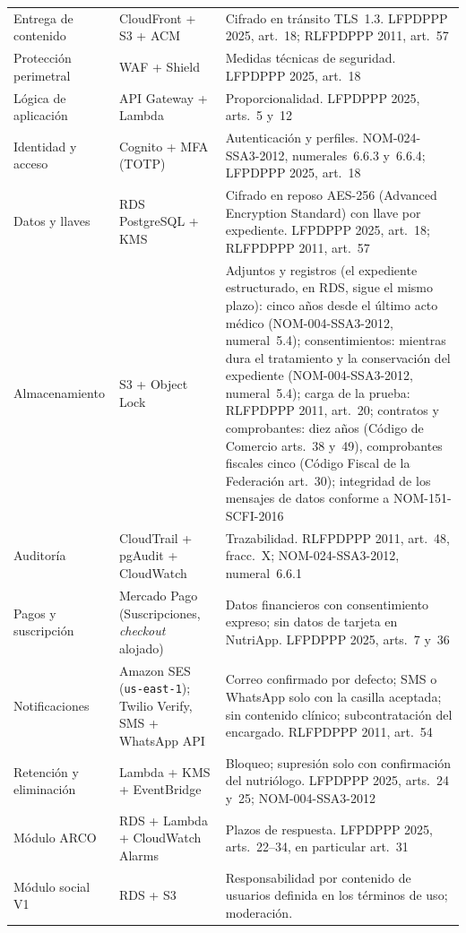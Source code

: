 \documentclass[12pt, a4paper]{article}
\begin{document}
\begin{longtable}{>{\raggedright\arraybackslash}p{3cm}
  >{\raggedright\arraybackslash}p{4cm}
  >{\raggedright\arraybackslash}p{7.2cm}}
  Entrega de contenido & CloudFront + S3 + ACM & Cifrado en tránsito
    TLS~1.3. LFPDPPP 2025, art.~18; RLFPDPPP 2011, art.~57 \\[4pt]
  Protección perimetral & WAF + Shield & Medidas técnicas de
    seguridad. LFPDPPP 2025, art.~18 \\[4pt]
  Lógica de aplicación & API Gateway + Lambda & Proporcionalidad.
    LFPDPPP 2025, arts.~5 y~12 \\[4pt]
  Identidad y acceso & Cognito + MFA (TOTP) & Autenticación y perfiles.
    NOM-024-SSA3-2012, numerales~6.6.3 y~6.6.4; LFPDPPP 2025, art.~18 \\[4pt]
  Datos y llaves & RDS PostgreSQL + KMS & Cifrado en reposo AES-256 (Advanced Encryption Standard) con
    llave por expediente. LFPDPPP 2025, art.~18; RLFPDPPP 2011, art.~57 \\[4pt]
  Almacenamiento & S3 + Object Lock & Adjuntos y registros (el
    expediente estructurado, en RDS, sigue el mismo plazo): cinco años
    desde el último acto médico (NOM-004-SSA3-2012, numeral~5.4);
    consentimientos: mientras dura el tratamiento y la conservación del
    expediente (NOM-004-SSA3-2012, numeral~5.4); carga de la prueba: RLFPDPPP 2011, art.~20;    contratos y comprobantes: diez años (Código de Comercio arts.~38
    y~49), comprobantes fiscales cinco (Código Fiscal de la Federación
    art.~30); integridad de los mensajes de datos
    conforme a NOM-151-SCFI-2016 \\[4pt]
  Auditoría & CloudTrail + pgAudit + CloudWatch & Trazabilidad.
    RLFPDPPP 2011, art.~48, fracc.~X; NOM-024-SSA3-2012, numeral~6.6.1 \\[4pt]
  Pagos y suscripción & Mercado Pago (Suscripciones, \textit{checkout} alojado) & Datos
    financieros con consentimiento expreso; sin datos de tarjeta en
    NutriApp. LFPDPPP 2025, arts.~7 y~36 \\[4pt]
  Notificaciones & Amazon SES (\texttt{us-east-1}); Twilio Verify, SMS + WhatsApp API & Correo
    confirmado por defecto; SMS o WhatsApp solo con la casilla aceptada;
    sin contenido clínico; subcontratación del encargado. RLFPDPPP 2011,
    art.~54 \\[4pt]
  Retención y eliminación & Lambda + KMS + EventBridge & Bloqueo;
    supresión solo con confirmación del nutriólogo. LFPDPPP 2025,
    arts.~24 y~25; NOM-004-SSA3-2012 \\[4pt]
  Módulo ARCO & RDS + Lambda + CloudWatch Alarms & Plazos de respuesta.
    LFPDPPP 2025, arts.~22--34, en particular art.~31 \\[4pt]
  Módulo social V1 & RDS + S3 & Responsabilidad por contenido de
    usuarios definida en los términos de uso; moderación. \\[4pt]

\end{longtable}
\end{document}
